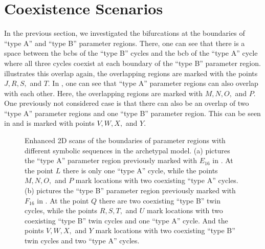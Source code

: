 \section{Coexistence Scenarios}
\label{sec:arch.coex}

In the previous section, we investigated the bifurcations at the boundaries of ``type A'' and ``type B'' parameter regions.
There, one can see that there is a space between the \glspl{bcb} of the ``type B'' cycles and the \gls{bcb} of the ``type A'' cycle where all three cycles coexist at each boundary of the ``type B'' parameter region.
 illustrates this overlap again, the overlapping regions are marked with the points $J, R, S,$ and $T$.
In , one can see that ``type A'' parameter regions can also overlap with each other.
Here, the overlapping regions are marked with $M, N, O,$ and $P$.
One previously not considered case is that there can also be an overlap of two ``type A'' parameter regions and one ``type B'' parameter region.
This can be seen in  and is marked with points $V, W, X,$ and $Y$.

\begin{figure}
	\centering
	\caption[Enhanced 2D scans of the boundaries of parameter regions with different symbolic sequences in the archetypal model]{
		Enhanced 2D scans of the boundaries of parameter regions with different symbolic sequences in the archetypal model.
		(a) pictures the ``type A'' parameter region previously marked with $E_{16}$ in .
		At the point $L$ there is only one ``type A'' cycle, while the points $M, N, O,$ and $P$ mark locations with two coexisting ``type A'' cycles.
		(b) pictures the ``type B'' parameter region previously marked with $F_{16}$ in .
		At the point $Q$ there are two coexisting ``type B'' twin cycles, while the points $R, S, T,$ and $U$ mark locations with two coexisting ``type B'' twin cycles and one ``type A'' cycle.
		And the points $V, W, X,$ and $Y$ mark locations with two coexisting ``type B'' twin cycles and two ``type A'' cycles.
	}
	\label{fig:arch.coex.regions}
\end{figure}

